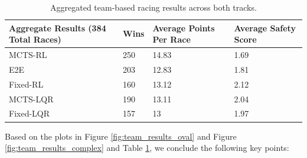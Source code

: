 \begin{table}[!ht]
    \centering
    \begin{tabular}{|p{4cm}|l|p{3.25cm}|p{3cm}|}
    \hline
        \textbf{Aggregate Results (384 Total Races)} & \textbf{Wins} & \textbf{Average Points Per Race} & \textbf{Average Safety Score} \\ \hline
        MCTS-RL & 250 & 14.83 & 1.69  \\ \hline
        E2E & 203 & 12.83 & 1.81  \\ \hline
        Fixed-RL & 160 & 13.12 & 2.12  \\ \hline
        MCTS-LQR & 190 & 13.11 & 2.04  \\ \hline
        Fixed-LQR & 157 & 13 & 1.97 \\ \hline
    \end{tabular}
    \caption[Aggregated team-based racing results.]{Aggregated team-based racing results across both tracks.}
    \label{tab:team_aggr_results}
\end{table}

Based on the plots in Figure \ref{fig:team_results_oval} and Figure \ref{fig:team_results_complex} and Table \ref{tab:team_aggr_results}, we conclude the following key points:

